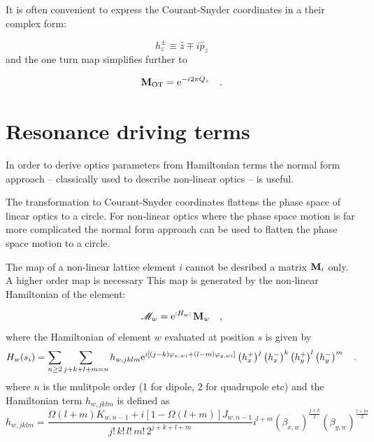 It is often convenient to express the Courant-Snyder coordinates in a their complex form:

\begin{equation}
    h^\pm_z \equiv \hat{z} \mp i \hat{p}_z
\end{equation}
and the one turn map simplifies further to

\begin{equation}
    \mathbf{M}_\text{OT} = \text{e}^{-i2\pi Q_z}
    \quad .
\end{equation}

\section{Resonance driving terms}

In order to derive optics parameters from Hamiltonian terms the normal form approach -- classically
used to describe non-linear optics -- is useful. 

The transformation to Courant-Snyder coordinates flattens the phase space of linear optics to a circle.
For non-linear optics where the phase space motion is far more complicated the normal form approach
can be used to flatten the phase space motion to a circle.

The map of a non-linear lattice element $i$ cannot be desribed a matrix $\mathbf{M}_i$ only.
A higher order map is necessary
This map is generated by the non-linear Hamiltonian of the element:

\begin{equation}
    \mathscr{M}_w = \text{e}^{{:}H_w{:}\,} \mathbf{M}_w
    \quad ,
\end{equation} 
where the Hamiltonian of element $w$ evaluated at position $s$ is given by
\begin{equation}
    H_w(s_i) = \sum\limits_{n\geq2} \sum\limits_{j+k+l+m=n} h_{w,jklm}
    \text{e}^{i \left[
        (j-k) \varphi_{x,wi} + (l-m) \varphi_{y,wi}
    \right]}
    \left(h_x^+\right)^j
    \left(h_x^-\right)^k
    \left(h_y^+\right)^l
    \left(h_y^-\right)^m
    \quad .
\end{equation}
where $n$ is the mulitpole order (1 for dipole, 2 for quadrupole etc)
and the Hamiltonian term $h_{w,jklm}$ is defined as
\begin{equation}
    h_{w,jklm} = 
    \frac{
        \Omega(l+m) K_{w,n-1} + i\left[1-\Omega(l+m)\right] J_{w,n-1}
    }{
        j!\,k!\,l!\,m!\,2^{j+k+l+m}
    }
    i^{l+m}
    (\beta_{x,w})^{\frac{j+k}{2}}
    (\beta_{y,w})^{\frac{l+m}{2}}
    \label{eq_hamiltonianterm}
\end{equation}

